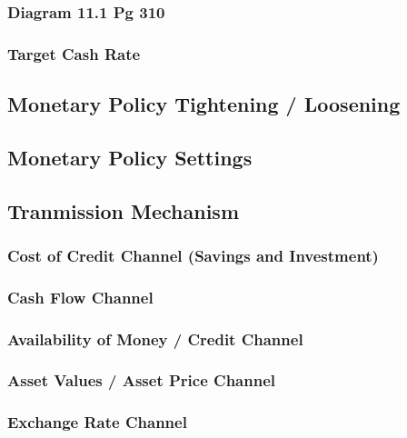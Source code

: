 \documentclass[11pt]{article}
\begin{document}
\subsubsection{Diagram 11.1 Pg 310}
\label{sec-3-5-1}

\subsubsection{Target Cash Rate}
\label{sec-3-5-2}

\subsection{Monetary Policy Tightening / Loosening}
\label{sec-3-6}



\subsection{Monetary Policy Settings}
\label{sec-3-7}

\subsection{Tranmission Mechanism}
\label{sec-3-8}

\subsubsection{Cost of Credit Channel (Savings and Investment)}
\label{sec-3-8-1}

\subsubsection{Cash Flow Channel}
\label{sec-3-8-2}

\subsubsection{Availability of Money / Credit Channel}
\label{sec-3-8-3}

\subsubsection{Asset Values / Asset Price Channel}
\label{sec-3-8-4}

\subsubsection{Exchange Rate Channel}
\label{sec-3-8-5}
\end{document}
